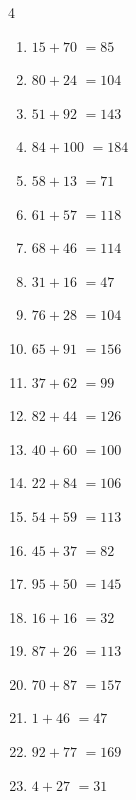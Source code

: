 \begin{multicols}{4}
\begin{enumerate}
  \item $15+70$
        $=85$

  \item $80+24$
        $=104$

  \item $51+92$
        $=143$

  \item $84+100$
        $=184$

  \item $58+13$
        $=71$

  \item $61+57$
        $=118$

  \item $68+46$
        $=114$

  \item $31+16$
        $=47$

  \item $76+28$
        $=104$

  \item $65+91$
        $=156$

  \item $37+62$
        $=99$

  \item $82+44$
        $=126$

  \item $40+60$
        $=100$

  \item $22+84$
        $=106$

\columnbreak %

  \item $54+59$
        $=113$

  \item $45+37$
        $=82$

  \item $95+50$
        $=145$

  \item $16+16$
        $=32$

  \item $87+26$
        $=113$

  \item $70+87$
        $=157$

  \item $1+46$
        $=47$

  \item $92+77$
        $=169$

  \item $4+27$
        $=31$


\end{enumerate}
\end{multicols}
